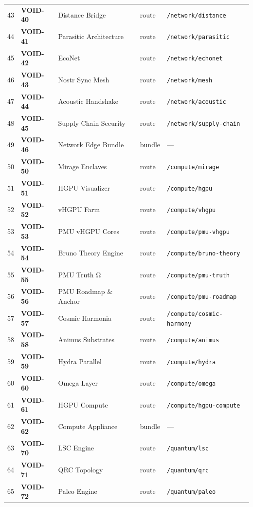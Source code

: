 \documentclass[10pt,a4paper,landscape]{article}
\begin{document}
\begin{longtable}{@{}rl p{4.2cm} p{1.4cm} p{3.8cm}@{}}
43 & \textbf{VOID-40} & Distance Bridge & route & \texttt{/network/distance} \\
44 & \textbf{VOID-41} & Parasitic Architecture & route & \texttt{/network/parasitic} \\
45 & \textbf{VOID-42} & EcoNet & route & \texttt{/network/echonet} \\
46 & \textbf{VOID-43} & Nostr Sync Mesh & route & \texttt{/network/mesh} \\
47 & \textbf{VOID-44} & Acoustic Handshake & route & \texttt{/network/acoustic} \\
48 & \textbf{VOID-45} & Supply Chain Security & route & \texttt{/network/supply-chain} \\
49 & \textbf{VOID-46} & Network Edge Bundle & bundle & — \\
50 & \textbf{VOID-50} & Mirage Enclaves & route & \texttt{/compute/mirage} \\
51 & \textbf{VOID-51} & HGPU Visualizer & route & \texttt{/compute/hgpu} \\
52 & \textbf{VOID-52} & vHGPU Farm & route & \texttt{/compute/vhgpu} \\
53 & \textbf{VOID-53} & PMU vHGPU Cores & route & \texttt{/compute/pmu-vhgpu} \\
54 & \textbf{VOID-54} & Bruno Theory Engine & route & \texttt{/compute/bruno-theory} \\
55 & \textbf{VOID-55} & PMU Truth Ω & route & \texttt{/compute/pmu-truth} \\
56 & \textbf{VOID-56} & PMU Roadmap \& Anchor & route & \texttt{/compute/pmu-roadmap} \\
57 & \textbf{VOID-57} & Cosmic Harmonia & route & \texttt{/compute/cosmic-harmony} \\
58 & \textbf{VOID-58} & Animus Substrates & route & \texttt{/compute/animus} \\
59 & \textbf{VOID-59} & Hydra Parallel & route & \texttt{/compute/hydra} \\
60 & \textbf{VOID-60} & Omega Layer & route & \texttt{/compute/omega} \\
61 & \textbf{VOID-61} & HGPU Compute & route & \texttt{/compute/hgpu-compute} \\
62 & \textbf{VOID-62} & Compute Appliance & bundle & — \\
63 & \textbf{VOID-70} & LSC Engine & route & \texttt{/quantum/lsc} \\
64 & \textbf{VOID-71} & QRC Topology & route & \texttt{/quantum/qrc} \\
65 & \textbf{VOID-72} & Paleo Engine & route & \texttt{/quantum/paleo} \\

\end{longtable}
\end{document}
